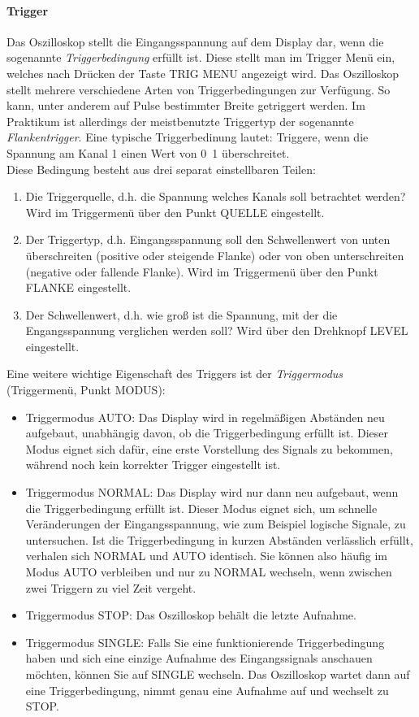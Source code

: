   \paragraph{Trigger} 
  Das Oszilloskop stellt die Eingangsspannung auf dem Display dar, wenn die sogenannte \textit{Triggerbedingung} erfüllt ist. Diese stellt man im Trigger Menü ein, welches nach Drücken der Taste TRIG MENU angezeigt wird. 
  Das Oszilloskop stellt mehrere verschiedene Arten von Triggerbedingungen zur Verfügung. So kann, unter anderem auf Pulse bestimmter Breite getriggert werden. Im Praktikum ist allerdings der meistbenutzte Triggertyp der sogenannte \textit{Flankentrigger}. Eine typische Triggerbedinung lautet: Triggere, wenn die Spannung am Kanal 1 einen Wert von \unit{0.1}{\volt} überschreitet.\\
  Diese Bedingung besteht aus drei separat einstellbaren Teilen:
  \begin{enumerate}
    \item Die Triggerquelle, d.h. die Spannung welches Kanals soll betrachtet werden? Wird im Triggermenü über den Punkt QUELLE eingestellt.
    \item Der Triggertyp, d.h. Eingangsspannung soll den Schwellenwert von unten überschreiten (positive oder steigende Flanke) oder von oben unterschreiten (negative oder fallende Flanke). Wird im Triggermenü über den Punkt FLANKE eingestellt.
    \item Der Schwellenwert, d.h. wie groß ist die Spannung, mit der die Engangsspannung verglichen werden soll? Wird über den Drehknopf LEVEL eingestellt.
  \end{enumerate}
  Eine weitere wichtige Eigenschaft des Triggers ist der \textit{Triggermodus} (Triggermenü, Punkt MODUS):
  \begin{itemize}
    \item Triggermodus AUTO: Das Display wird in regelmäßigen Abständen neu aufgebaut, unabhängig davon, ob die Triggerbedingung erfüllt ist. Dieser Modus eignet sich dafür, eine erste Vorstellung des Signals zu bekommen, w\"ahrend noch kein korrekter Trigger eingestellt ist.
    \item Triggermodus NORMAL: Das Display wird nur dann neu aufgebaut, wenn die Triggerbedingung erfüllt ist. Dieser Modus eignet sich, um schnelle Veränderungen der Eingangsspannung, wie zum Beispiel logische Signale, zu untersuchen.
      Ist die Triggerbedingung in kurzen Abst\"anden verl\"asslich erf\"ullt,
      verhalen sich NORMAL und AUTO identisch. Sie k\"onnen also h\"aufig im
      Modus AUTO verbleiben und nur zu NORMAL wechseln, wenn zwischen
      zwei Triggern zu viel Zeit vergeht.
    \item
      Triggermodus STOP: Das Oszilloskop beh\"alt die letzte Aufnahme.
    \item
      Triggermodus SINGLE: Falls Sie eine funktionierende Triggerbedingung haben
      und sich eine einzige Aufnahme des Eingangssignals anschauen m\"ochten,
      k\"onnen Sie auf SINGLE wechseln. Das Oszilloskop wartet dann auf eine
      Triggerbedingung, nimmt genau eine Aufnahme auf und wechselt zu STOP.
  \end{itemize}
	
